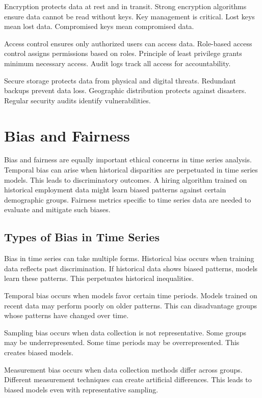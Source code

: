 Encryption protects data at rest and in transit. Strong encryption algorithms ensure data cannot be read without keys. Key management is critical. Lost keys mean lost data. Compromised keys mean compromised data.

Access control ensures only authorized users can access data. Role-based access control assigns permissions based on roles. Principle of least privilege grants minimum necessary access. Audit logs track all access for accountability.

Secure storage protects data from physical and digital threats. Redundant backups prevent data loss. Geographic distribution protects against disasters. Regular security audits identify vulnerabilities.

\section{Bias and Fairness}

Bias and fairness are equally important ethical concerns in time series analysis. Temporal bias can arise when historical disparities are perpetuated in time series models. This leads to discriminatory outcomes. A hiring algorithm trained on historical employment data might learn biased patterns against certain demographic groups. Fairness metrics specific to time series data are needed to evaluate and mitigate such biases.

\subsection{Types of Bias in Time Series}

Bias in time series can take multiple forms. Historical bias occurs when training data reflects past discrimination. If historical data shows biased patterns, models learn these patterns. This perpetuates historical inequalities.

Temporal bias occurs when models favor certain time periods. Models trained on recent data may perform poorly on older patterns. This can disadvantage groups whose patterns have changed over time.

Sampling bias occurs when data collection is not representative. Some groups may be underrepresented. Some time periods may be overrepresented. This creates biased models.

Measurement bias occurs when data collection methods differ across groups. Different measurement techniques can create artificial differences. This leads to biased models even with representative sampling.

